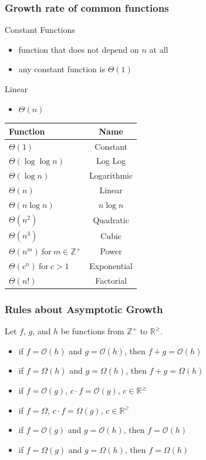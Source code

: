 \subsubsection*{Growth rate of common functions}
Constant Functions
\begin{itemize}
  \item function that does not depend on $n$ at all
  \item any constant function is $\Theta(1)$
\end{itemize}
Linear
\begin{itemize}
  \item $\Theta(n)$
\end{itemize}
\begin{center}
  \begin{tabular}{l|c}
    Function                                   & Name        \\
    \hline
    $\Theta(1)$                                & Constant    \\
    $\Theta(\log\log n)$                       & Log Log     \\
    $\Theta(\log n)$                           & Logarithmic \\
    $\Theta(n)$                                & Linear      \\
    $\Theta(n \log n)$                         & $n \log n$  \\
    $\Theta(n^2)$                              & Quadratic   \\
    $\Theta(n^3)$                              & Cubic       \\
    $\Theta(n^m)~\text{for}~m\in \mathbb{Z}^+$ & Power       \\
    $\Theta(c^n)~\text{for}~c>1$               & Exponential \\
    $\Theta(n!)$                               & Factorial
  \end{tabular}
\end{center}

\subsubsection*{Rules about Asymptotic Growth}
Let $f$, $g$, and $h$ be functions from $\mathbb{Z}^+$ to $\mathbb{R}^{\geq}$.
\begin{itemize}
  \item if $f=\mathcal{O}(h)$ and $g=\mathcal{O}(h)$, then $f+g=\mathcal{O}(h)$
  \item if $f=\Omega(h)$ and $g=\Omega(h)$, then $f+g=\Omega(h)$
  \item if $f=\mathcal{O}(g)$, $c \cdot f = \mathcal{O}(g)$, $c\in \mathbb{R}^{\geq}$
  \item if $f=\Omega$, $c \cdot f = \Omega(g)$, $c\in \mathbb{R}^{\geq}$
  \item if $f=\mathcal{O}(g)$ and $g=\mathcal{O}(h)$, then $f=\mathcal{O}(h)$
  \item if $f=\Omega(g)$ and $g=\Omega(h)$, then $f=\Omega(h)$
\end{itemize}

